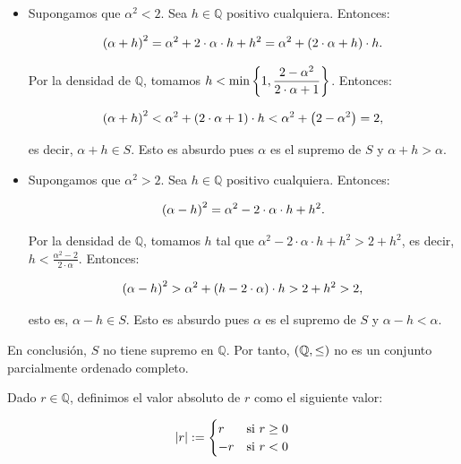 \begin{itemize}
  \item Supongamos que $\alpha^2<2$. Sea $h\in\mathbb{Q}$ positivo cualquiera. Entonces:
  
  \begin{equation}
    \left(\alpha+h\right)^2=\alpha^2+2\cdot\alpha\cdot h+h^2=\alpha^2+\left(2\cdot\alpha+h\right)\cdot h.
  \end{equation}

  Por la densidad de $\mathbb{Q}$, tomamos $\displaystyle h<\min\left\{1,\frac{2-\alpha^2}{2\cdot\alpha+1}\right\}$. Entonces:

  \begin{equation}
    \left(\alpha+h\right)^2<\alpha^2+\left(2\cdot\alpha+1\right)\cdot h<\alpha^2+\left(2-\alpha^2\right)=2,
  \end{equation}

  es decir, $\alpha+h\in S$. Esto es absurdo pues $\alpha$ es el supremo de $S$ y $\alpha+h>\alpha$.

  \item Supongamos que $\alpha^2>2$. Sea $h\in\mathbb{Q}$ positivo cualquiera. Entonces:
  
  \begin{equation}
    \left(\alpha-h\right)^2=\alpha^2-2\cdot\alpha\cdot h+h^2.
  \end{equation}

  Por la densidad de $\mathbb{Q}$, tomamos $h$ tal que $\alpha^2-2\cdot\alpha\cdot h+h^2>2+h^2$, es decir, $\displaystyle h<\frac{\alpha^2-2}{2\cdot\alpha}$. Entonces:

  
  \begin{equation}
    \left(\alpha-h\right)^2>\alpha^2+\left(h-2\cdot\alpha\right)\cdot h>2+h^2>2,
  \end{equation}

  esto es, $\alpha-h\in S$. Esto es absurdo pues $\alpha$ es el supremo de $S$ y $\alpha-h<\alpha$.
\end{itemize}

En conclusión, $S$ no tiene supremo en $\mathbb{Q}$. Por tanto, $\left(\mathbb{Q},\leq\right)$ no es un conjunto parcialmente ordenado completo.


\begin{definition}
  \rm Dado $r\in\mathbb{Q}$, definimos el valor absoluto de $r$ como el siguiente valor:

  \begin{equation}
    \left|r\right|:=\begin{cases}
      r & \text{si $r\geq 0$}\\
      -r & \text{si $r<0$}
    \end{cases}
  \end{equation}
\end{definition}

